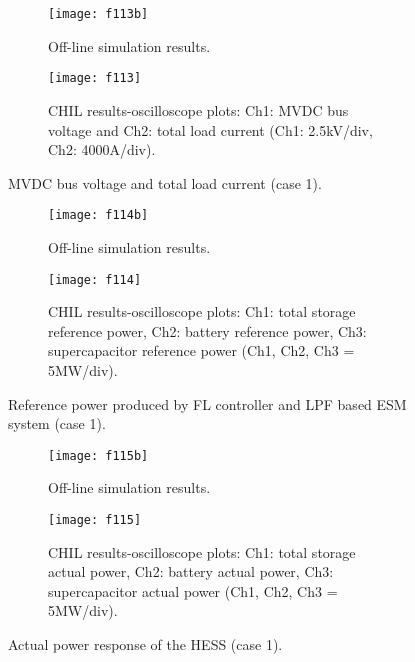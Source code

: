 \begin{figure}[ht!]
\begin{subfigure}{1\columnwidth}
\begin{center}
\texttt{[image: f113b]}
\end{center}
\caption{Off-line simulation results.}
\label{ch5_f113b}
\end{subfigure}
\begin{subfigure}{1\columnwidth}
\begin{center}
\texttt{[image: f113]}
\end{center}
\caption{CHIL results-oscilloscope plots: Ch1: MVDC bus voltage and Ch2: total load current (Ch1: 2.5kV/div, Ch2: 4000A/div).}
\label{ch5_f113a}
\end{subfigure}
\caption{MVDC bus voltage and total load current (case 1).}
\label{ch5_f113}
\end{figure}
\begin{figure}[ht!]
\begin{subfigure}{1\columnwidth}
\begin{center}
\texttt{[image: f114b]}
\end{center}
\caption{Off-line simulation results.}
\label{ch5_f114b}
\end{subfigure}
\begin{subfigure}{1\columnwidth}
\begin{center}
\texttt{[image: f114]}
\end{center}
\caption{CHIL results-oscilloscope plots: Ch1: total storage reference power, Ch2: battery reference power, Ch3: supercapacitor reference  power (Ch1, Ch2, Ch3 = 5MW/div).}
\label{ch5_f114a}
\end{subfigure}
\caption{Reference power produced by FL controller and LPF based ESM system (case 1).}
\label{ch5_f114}
\end{figure}
\begin{figure}[ht!]
\begin{subfigure}{1\columnwidth}
\begin{center}
\texttt{[image: f115b]}
\end{center}
\caption{Off-line simulation results.}
\label{ch5_f115b}
\end{subfigure}
\begin{subfigure}{1\columnwidth}
\begin{center}
\texttt{[image: f115]}
\end{center}
\caption{CHIL results-oscilloscope plots: Ch1: total storage actual power, Ch2: battery actual power, Ch3: supercapacitor actual power (Ch1, Ch2, Ch3 = 5MW/div).}
\label{ch5_f115a}
\end{subfigure}
\caption{Actual power response of the HESS (case 1).}
\label{ch5_f115}
\end{figure}
